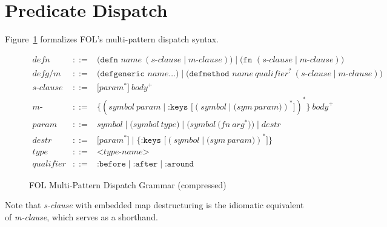 \documentclass[sigconf,nonacm]{acmart}
\begin{document}
\section{Predicate Dispatch}
\label{sec:dispatch}
Figure~\ref{fig:grammar} formalizes FOL's multi-pattern dispatch syntax.

\begin{figure}[htbp]
\centering
\small
$\begin{array}{rcl}
\textit{defn} & ::= & \texttt{(defn } \textit{name} ~ (\textit{s-clause} \mid \textit{m-clause}) \texttt{)} \mid \texttt{(fn } (\textit{s-clause} \mid \textit{m-clause}) \texttt{)} \\
\textit{defg/m} & ::= & \texttt{(defgeneric } \textit{name} \dots \texttt{)} \mid \texttt{(defmethod } \textit{name} ~ \textit{qualifier}^? ~ (\textit{s-clause} \mid \textit{m-clause}) \texttt{)} \\
\textit{s-clause}& ::= & \texttt{[} \textit{param}^* \texttt{]} ~ \textit{body}^+ \\
\textit{m-clause}& ::= & \texttt{\{} (\textit{symbol} ~ \textit{param} \mid \texttt{:keys~[} (\textit{symbol} \mid \texttt{(} \textit{sym} ~ \textit{param} \texttt{)})^* \texttt{]})^* \texttt{\}} ~ \textit{body}^+ \\
\textit{param} & ::= & \textit{symbol} \mid \texttt{(} \textit{symbol} ~ \textit{type} \texttt{)} \mid \texttt{(} \textit{symbol} ~ \texttt{(} \textit{fn} ~ \textit{arg}^* \texttt{)} \texttt{)} \mid \textit{destr} \\
\textit{destr} & ::= & \texttt{[} \textit{param}^* \texttt{]} \mid \texttt{\{} \texttt{:keys~[} (\textit{symbol} \mid \texttt{(} \textit{sym} ~ \textit{param} \texttt{)})^* \texttt{]} \texttt{\}} \\
\textit{type} & ::= & \texttt{<}\textit{type-name}\texttt{>} \\
\textit{qualifier} & ::= & \texttt{:before} \mid \texttt{:after} \mid \texttt{:around}
\end{array}$
\caption{FOL Multi-Pattern Dispatch Grammar (compressed)}
\label{fig:grammar}
\end{figure}

Note that \textit{s-clause} with embedded map destructuring is the idiomatic equivalent of \textit{m-clause}, which serves as a shorthand.
\end{document}
